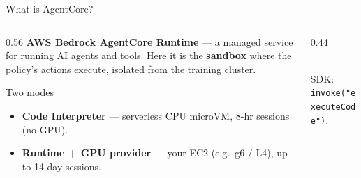 \documentclass[aspectratio=169]{beamer}
\begin{document}
\begin{frame}{What is AgentCore?}
  \begin{columns}[T]
    \begin{column}{0.56\textwidth}
      \textbf{AWS Bedrock AgentCore Runtime} --- a managed service for running AI agents
      and tools. Here it is the \textbf{sandbox} where the policy's actions execute,
      isolated from the training cluster.
      \vspace{0.4em}
      \begin{block}{Two modes}
        \begin{itemize}\setlength\itemsep{0.2em}
          \item \textbf{Code Interpreter} --- serverless CPU microVM, 8-hr sessions (no GPU).
          \item \textbf{Runtime + GPU provider} --- your EC2 (e.g.\ g6 / L4), up to 14-day sessions.
        \end{itemize}
      \end{block}
    \end{column}
    \begin{column}{0.44\textwidth}
      \centering
      \\[0.3em]\footnotesize SDK: \texttt{invoke("executeCode")}.
    \end{column}
  \end{columns}
\end{frame}
\end{document}
